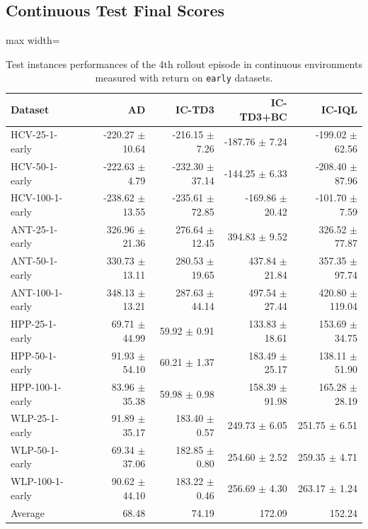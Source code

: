 \documentclass{article}
\begin{document}
\subsection{Continuous Test Final Scores}
\begin{table}[ht]
    \label{tab:}
    \begin{center}
    \caption{Test instances performances of the 4th rollout episode in continuous environments measured with return on \texttt{early} datasets.}
    \begin{small}
    \begin{adjustbox}{max width=\columnwidth}
		\begin{tabular}{l|rrrr}
		\toprule
	\textbf{Dataset} & \textbf{AD} & \textbf{IC-TD3} & \textbf{IC-TD3+BC} & \textbf{IC-IQL}\\
\midrule
HCV-25-1-early & -220.27 $\pm$ 10.64 & -216.15 $\pm$ 7.26 & -187.76 $\pm$ 7.24 & -199.02 $\pm$ 62.56\\
HCV-50-1-early & -222.63 $\pm$ 4.79 & -232.30 $\pm$ 37.14 & -144.25 $\pm$ 6.33 & -208.40 $\pm$ 87.96\\
HCV-100-1-early & -238.62 $\pm$ 13.55 & -235.61 $\pm$ 72.85 & -169.86 $\pm$ 20.42 & -101.70 $\pm$ 7.59\\
ANT-25-1-early & 326.96 $\pm$ 21.36 & 276.64 $\pm$ 12.45 & 394.83 $\pm$ 9.52 & 326.52 $\pm$ 77.87\\
ANT-50-1-early & 330.73 $\pm$ 13.11 & 280.53 $\pm$ 19.65 & 437.84 $\pm$ 21.84 & 357.35 $\pm$ 97.74\\
ANT-100-1-early & 348.13 $\pm$ 13.21 & 287.63 $\pm$ 44.14 & 497.54 $\pm$ 27.44 & 420.80 $\pm$ 119.04\\
HPP-25-1-early & 69.71 $\pm$ 44.99 & 59.92 $\pm$ 0.91 & 133.83 $\pm$ 18.61 & 153.69 $\pm$ 34.75\\
HPP-50-1-early & 91.93 $\pm$ 54.10 & 60.21 $\pm$ 1.37 & 183.49 $\pm$ 25.17 & 138.11 $\pm$ 51.90\\
HPP-100-1-early & 83.96 $\pm$ 35.38 & 59.98 $\pm$ 0.98 & 158.39 $\pm$ 91.98 & 165.28 $\pm$ 28.19\\
WLP-25-1-early & 91.89 $\pm$ 35.17 & 183.40 $\pm$ 0.57 & 249.73 $\pm$ 6.05 & 251.75 $\pm$ 6.51\\
WLP-50-1-early & 69.34 $\pm$ 37.06 & 182.85 $\pm$ 0.80 & 254.60 $\pm$ 2.52 & 259.35 $\pm$ 4.71\\
WLP-100-1-early & 90.62 $\pm$ 44.10 & 183.22 $\pm$ 0.46 & 256.69 $\pm$ 4.30 & 263.17 $\pm$ 1.24\\
\midrule
Average & 68.48 & 74.19 & 172.09 & 152.24\\
\end{tabular}
        \end{adjustbox}
    \end{small}
    \end{center}
    \vskip -0.1in
\end{table}
\end{document}
